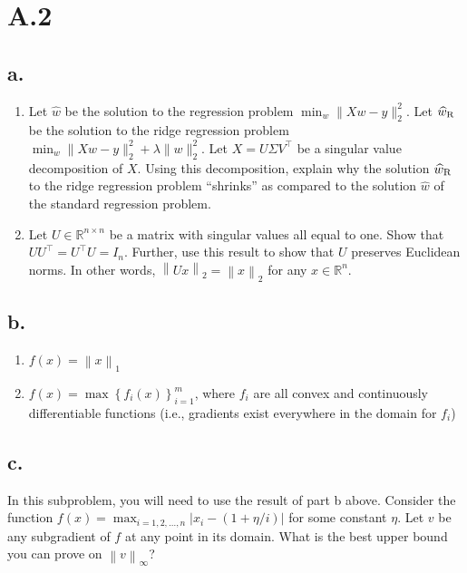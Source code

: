 \documentclass{article}
\newcommand{\field}[1]{\mathbb{#1}}
\newcommand{\1}{\mathbf{1}}
\newcommand{\R}{\field{R}} %
\newcommand{\norm}[1]{\left\|#1\right\|}
\newcommand{\twonorm}[1]{\|#1\|_2^2}
\begin{document}
\section*{A.2}
{\Large

\subsection*{a.}

\begin{enumerate}
  \item Let $\widehat{w}$ be the solution to the regression problem $\min_{w} \twonorm{Xw - y}$. Let $\widehat{w}_{\rm R}$ be the solution to the ridge regression problem $\min_w \twonorm{X w - y} + \lambda \twonorm{w}$. Let $X = U \Sigma V^\top$ be a singular value decomposition of $X$. Using this decomposition, explain why the solution $\widehat{w}_{\rm R}$ to the ridge regression problem ``shrinks'' as compared to the solution $\widehat{w}$ of the standard regression problem.
  


  \item Let $U \in \R^{n\times n}$ be a matrix with singular values all equal to one. Show that $UU^\top = U^\top U = I_n$. Further, use this result to show that $U$ preserves Euclidean norms. In other words, $\norm{U x}_2 = \norm{x}_2$ for any $x\in \R^n$. 
  

\end{enumerate}

\subsection*{b.}

\begin{enumerate}
  \item $f(x) = \norm{x}_1$ 
  \item $f(x) = \max \left\{f_i(x)\right\}_{i =1}^m$, where $f_i$ are all convex and continuously differentiable functions (i.e., gradients exist everywhere in the domain for $f_i$)
\end{enumerate}

\subsection*{c.}

In this subproblem, you will need to use the result of part b above. Consider the function $f(x) = \max_{i = 1, 2, \dots, n} |x_i - (1 + \eta/i)|$ for some constant $\eta$. Let $v$ be any subgradient of $f$ at any point in its domain. What is the best upper bound you can prove on $\norm{v}_{\infty}$?  

}
\end{document}
